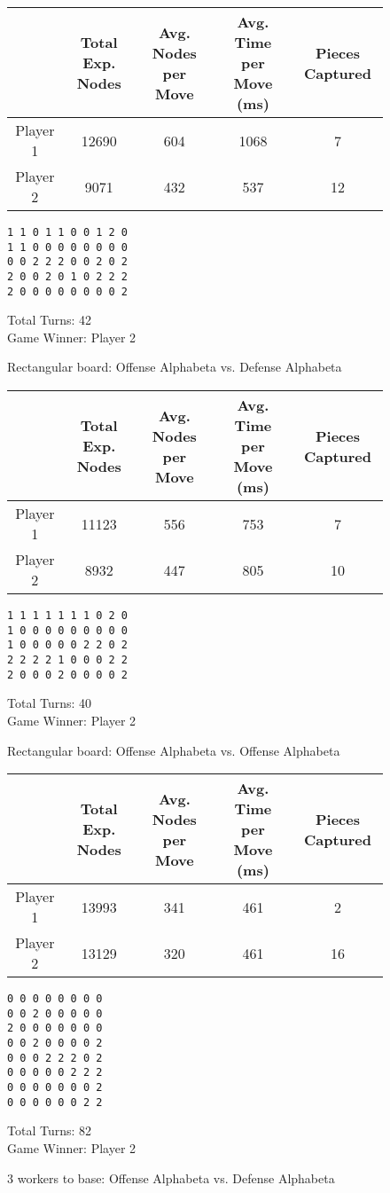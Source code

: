 \documentclass{article}
\begin{document}
\begin{figure}[H]
\begin{tabular}{|c|c|c|c|c|}
\hline 
 & Total Exp. Nodes & Avg. Nodes per Move & Avg. Time per Move (ms) & Pieces Captured \\
\hline
 Player 1 & 12690 & 604 & 1068 & 7 \\
\hline
 Player 2 & 9071 & 432 & 537 & 12 \\
\hline
\end{tabular}
\begin{verbatim}
1 1 0 1 1 0 0 1 2 0 
1 1 0 0 0 0 0 0 0 0 
0 0 2 2 2 0 0 2 0 2 
2 0 0 2 0 1 0 2 2 2 
2 0 0 0 0 0 0 0 0 2 
\end{verbatim}
Total Turns: 42\\
Game Winner: Player 2
\caption{Rectangular board: Offense Alphabeta vs. Defense Alphabeta}
\end{figure}

\begin{figure}[H]
\begin{tabular}{|c|c|c|c|c|}
\hline 
 & Total Exp. Nodes & Avg. Nodes per Move & Avg. Time per Move (ms) & Pieces Captured \\
\hline
 Player 1 & 11123 & 556 & 753 & 7 \\
\hline
 Player 2 & 8932 & 447 & 805 & 10 \\
\hline
\end{tabular}
\begin{verbatim}
1 1 1 1 1 1 1 0 2 0 
1 0 0 0 0 0 0 0 0 0 
1 0 0 0 0 0 2 2 0 2 
2 2 2 2 1 0 0 0 2 2 
2 0 0 0 2 0 0 0 0 2 
\end{verbatim}
Total Turns: 40\\
Game Winner: Player 2
\caption{Rectangular board: Offense Alphabeta vs. Offense Alphabeta}
\end{figure}

\begin{figure}[H]
\begin{tabular}{|c|c|c|c|c|}
\hline 
 & Total Exp. Nodes & Avg. Nodes per Move & Avg. Time per Move (ms) & Pieces Captured \\
\hline
 Player 1 & 13993 & 341 & 461 & 2 \\
\hline
 Player 2 & 13129 & 320 & 461 & 16 \\
\hline
\end{tabular}
\begin{verbatim}
0 0 0 0 0 0 0 0 
0 0 2 0 0 0 0 0 
2 0 0 0 0 0 0 0 
0 0 2 0 0 0 0 2 
0 0 0 2 2 2 0 2 
0 0 0 0 0 2 2 2 
0 0 0 0 0 0 0 2 
0 0 0 0 0 0 2 2 
\end{verbatim}
Total Turns: 82\\
Game Winner: Player 2
\caption{3 workers to base: Offense Alphabeta vs. Defense Alphabeta}
\end{figure}
\end{document}
